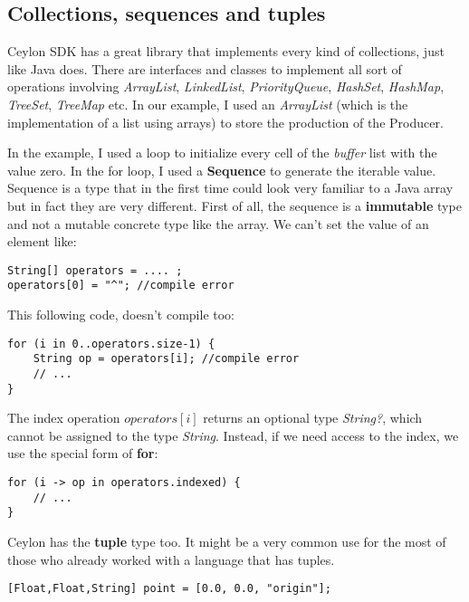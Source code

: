 \documentclass{abnt}
\begin{document}
\subsection{Collections, sequences and tuples}

Ceylon SDK has a great library that implements every kind of collections, just
like Java does. There are interfaces and classes to implement all sort of
operations involving \textit{ArrayList}, \textit{LinkedList}, 
\textit{PriorityQueue}, \textit{HashSet}, \textit{HashMap}, \textit{TreeSet},
\textit{TreeMap} etc\cite{2_3}. In our example, I used an \textit{ArrayList}
(which is the implementation of a list using arrays) to store the production of
the Producer.

In the example, I used a loop to initialize every cell of the \textit{buffer}
list with the value zero. In the for loop, I used a \textbf{Sequence} to
generate the iterable value. Sequence is a type that in the first time could
look very familiar to a Java array but in fact they are very different. First of
all, the sequence is a \textbf{immutable} type and not a mutable concrete type
like the array. We can't set the value of an element like:

\begin{lstlisting}[label=cpc,caption=Ceylon Producer-Consumer example]
String[] operators = .... ;
operators[0] = "^"; //compile error
\end{lstlisting}

This following code, doesn't compile too:

\begin{lstlisting}[label=cpc,caption=Ceylon Producer-Consumer example]
for (i in 0..operators.size-1) {
    String op = operators[i]; //compile error
    // ...
}
\end{lstlisting}

The index operation $operators[i]$ returns an optional type \textit{String?},
which cannot be assigned to the type \textit{String}. Instead, if we need access
to the index, we use the special form of \textbf{for}:

\begin{lstlisting}[label=cpc,caption=Ceylon Producer-Consumer example]
for (i -> op in operators.indexed) {
    // ...
}
\end{lstlisting}

Ceylon has the \textbf{tuple} type too. It might be a very common use for the
most of those who already worked with a language that has tuples.

\begin{lstlisting}[label=cpc,caption=Ceylon Producer-Consumer example]
[Float,Float,String] point = [0.0, 0.0, "origin"];
\end{lstlisting}
\end{document}
